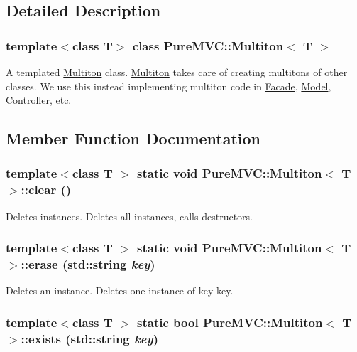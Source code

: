 \subsection{Detailed Description}
\subsubsection*{template$<$class T$>$ class PureMVC::Multiton$<$ T $>$}

A templated \hyperlink{class_pure_m_v_c_1_1_multiton}{Multiton} class. \hyperlink{class_pure_m_v_c_1_1_multiton}{Multiton} takes care of creating multitons of other classes. We use this instead implementing multiton code in \hyperlink{class_pure_m_v_c_1_1_facade}{Facade}, \hyperlink{class_pure_m_v_c_1_1_model}{Model}, \hyperlink{class_pure_m_v_c_1_1_controller}{Controller}, etc. 

\subsection{Member Function Documentation}
\hypertarget{class_pure_m_v_c_1_1_multiton_ac583e3bba8cd9b409f4d78acca48e4c6}{
\subsubsection[{clear}]{\setlength{\rightskip}{0pt plus 5cm}template$<$class T $>$ static void {\bf PureMVC::Multiton}$<$ T $>$::clear ()}}
\label{class_pure_m_v_c_1_1_multiton_ac583e3bba8cd9b409f4d78acca48e4c6}


Deletes instances. Deletes all instances, calls destructors. \hypertarget{class_pure_m_v_c_1_1_multiton_a0e50d82ec223f628312fbf6693fa1477}{
\subsubsection[{erase}]{\setlength{\rightskip}{0pt plus 5cm}template$<$class T $>$ static void {\bf PureMVC::Multiton}$<$ T $>$::erase (std::string {\em key})}}
\label{class_pure_m_v_c_1_1_multiton_a0e50d82ec223f628312fbf6693fa1477}


Deletes an instance. Deletes one instance of key {\ttfamily key}. \hypertarget{class_pure_m_v_c_1_1_multiton_a3233f3621b8aa564d8da435de122426b}{
\subsubsection[{exists}]{\setlength{\rightskip}{0pt plus 5cm}template$<$class T $>$ static bool {\bf PureMVC::Multiton}$<$ T $>$::exists (std::string {\em key})}}
\label{class_pure_m_v_c_1_1_multiton_a3233f3621b8aa564d8da435de122426b}


